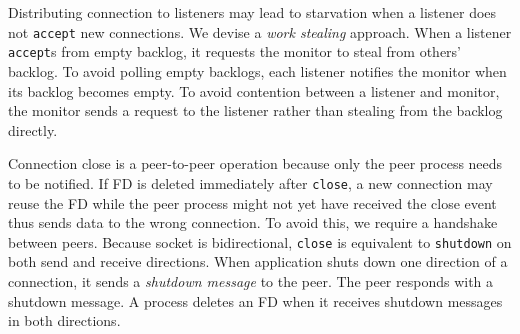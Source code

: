 Distributing connection to listeners may lead to starvation when a listener does not \texttt{accept} new connections. We devise a \textit{work stealing} approach. When a listener \texttt{accept}s from empty backlog, it requests the monitor to steal from others' backlog. To avoid polling empty backlogs, each listener notifies the monitor when its backlog becomes empty. To avoid contention between a listener and monitor, the monitor sends a request to the listener rather than stealing from the backlog directly.


Connection close is a peer-to-peer operation because only the peer process needs to be notified. If FD is deleted immediately after \texttt{close}, a new connection may reuse the FD while the peer process might not yet have received the close event thus sends data to the wrong connection. To avoid this, we require a handshake between peers.
Because socket is bidirectional, \texttt{close} is equivalent to \texttt{shutdown} on both send and receive directions.
When application shuts down one direction of a connection, it sends a \textit{shutdown message} to the peer. The peer responds with a shutdown message. A process deletes an FD when it receives shutdown messages in both directions.



\fi
